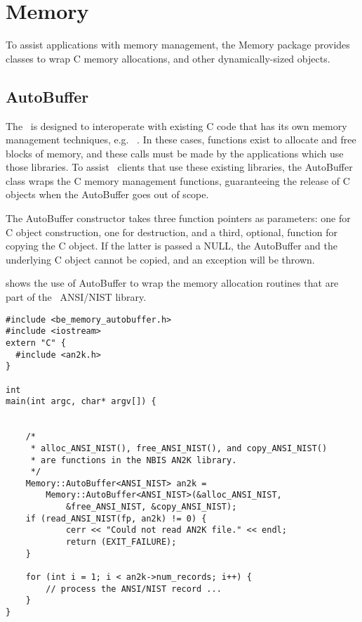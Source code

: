 %
%
\chapter{Memory}
\label{chp-memory}
To assist applications with memory management, the Memory package provides
classes to wrap C memory allocations, and other dynamically-sized objects.

\section{AutoBuffer}
\label{sec-autobuffer}
The \lname\ is designed to interoperate with existing C code that has its own
memory management techniques, e.g. \nbis~\cite{nbis}. In these cases, functions
exist to allocate and free blocks of memory, and these calls must be made by
the applications which use those libraries. To assist \sname\ clients that
use these existing libraries, the AutoBuffer class wraps the C memory
management functions, guaranteeing the release of C objects when the
AutoBuffer goes out of scope.

The AutoBuffer constructor takes three function pointers as parameters: one for
C object construction, one for destruction, and a third, optional, function
for copying the C object. If the latter is passed a NULL, the AutoBuffer and
the underlying C object cannot be copied, and an exception will be thrown.

 shows the use of AutoBuffer to wrap the memory
allocation routines that are part of the \nbis\ ANSI/NIST library.

\begin{lstlisting}[caption={Using the AutoBuffer}, label=autobufferuse]
#include <be_memory_autobuffer.h>
#include <iostream>
extern "C" {
  #include <an2k.h>
}

int
main(int argc, char* argv[]) {


    /*
     * alloc_ANSI_NIST(), free_ANSI_NIST(), and copy_ANSI_NIST()
     * are functions in the NBIS AN2K library.
     */
    Memory::AutoBuffer<ANSI_NIST> an2k =
        Memory::AutoBuffer<ANSI_NIST>(&alloc_ANSI_NIST,
            &free_ANSI_NIST, &copy_ANSI_NIST);
    if (read_ANSI_NIST(fp, an2k) != 0) {
            cerr << "Could not read AN2K file." << endl;
            return (EXIT_FAILURE);
    }

    for (int i = 1; i < an2k->num_records; i++) {
        // process the ANSI/NIST record ...
    }
}

\end{lstlisting}

